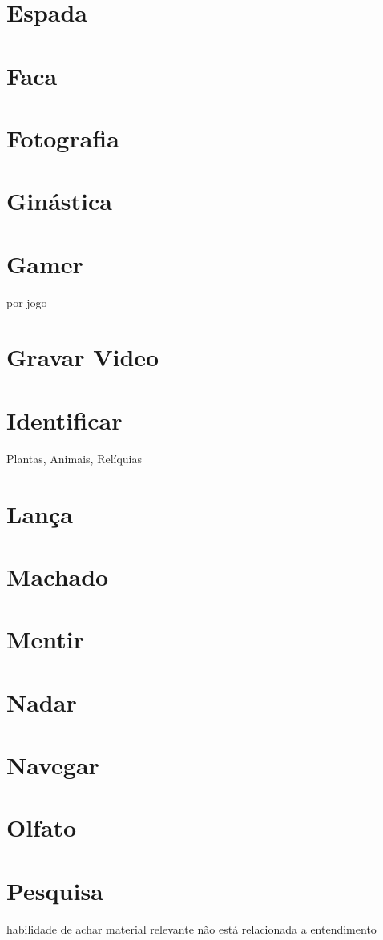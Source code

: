 \section{Espada}
\section{Faca}
\section{Fotografia}
\section{Ginástica}%
\section{Gamer} por jogo
\section{Gravar Video}
\section{Identificar} Plantas, Animais, Relíquias
\section{Lança}
\section{Machado}
\section{Mentir}
\section{Nadar}
\section{Navegar}%
\section{Olfato}
\section{Pesquisa} habilidade de achar material relevante não está relacionada a entendimento %
